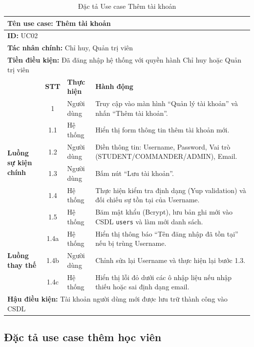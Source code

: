\documentclass[../DoAn.tex]{subfiles}
\begin{document}
\begin{table}[H]
\centering
\small
\renewcommand{\arraystretch}{1.2}
\begin{tabular}{|p{2.2cm}|c|p{2cm}|p{8.5cm}|}
\hline
\multicolumn{4}{|l|}{\textbf{Tên use case:} Thêm tài khoản} \\ \hline
\multicolumn{4}{|l|}{\textbf{ID:} UC02} \\ \hline
\multicolumn{4}{|l|}{\textbf{Tác nhân chính:} Chỉ huy, Quản trị viên} \\ \hline
\multicolumn{4}{|l|}{\textbf{Tiền điều kiện:} Đã đăng nhập hệ thống với quyền hành Chỉ huy hoặc Quản trị viên} \\ \hline
 & \textbf{STT} & \textbf{Thực hiện} & \textbf{Hành động} \\ \hline
\multirow{6}{2.2cm}{\textbf{Luồng sự kiện chính}} 
& 1 & Người dùng & Truy cập vào màn hình ``Quản lý tài khoản'' và nhấn ``Thêm tài khoản''. \\ \cline{2-4}
& 1.1 & Hệ thống & Hiển thị form thông tin thêm tài khoản mới. \\ \cline{2-4}
& 1.2 & Người dùng & Điền thông tin: Username, Password, Vai trò (STUDENT/COMMANDER/ADMIN), Email. \\ \cline{2-4}
& 1.3 & Người dùng & Bấm nút ``Lưu tài khoản''. \\ \cline{2-4}
& 1.4 & Hệ thống & Thực hiện kiểm tra định dạng (Yup validation) và đối chiếu sự tồn tại của Username. \\ \cline{2-4}
& 1.5 & Hệ thống & Băm mật khẩu (Bcrypt), lưu bản ghi mới vào CSDL \texttt{users} và làm mới danh sách. \\ \hline
\multirow{3}{2.2cm}{\textbf{Luồng thay thế}} 
& 1.4a & Hệ thống & Hiển thị thông báo ``Tên đăng nhập đã tồn tại'' nếu bị trùng Username. \\ \cline{2-4}
& 1.4b & Người dùng & Chỉnh sửa lại Username và thực hiện lại bước 1.3. \\ \cline{2-4}
& 1.4c & Hệ thống & Hiển thị lỗi đỏ dưới các ô nhập liệu nếu nhập thiếu hoặc sai định dạng email. \\ \hline
\multicolumn{4}{|l|}{\textbf{Hậu điều kiện:} Tài khoản người dùng mới được lưu trữ thành công vào CSDL} \\ \hline
\end{tabular}
\caption{Đặc tả Use case Thêm tài khoản}
\label{table:uc_add_account}
\end{table}


\subsection{Đặc tả use case thêm học viên}
\hfill
\end{document}
